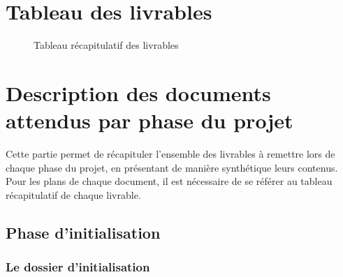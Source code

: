 \let\cleardoublepage\clearpage
\section{Tableau des livrables}

\vspace{-1cm}
\begin{figure}[H]
\noindent{}
\caption{Tableau récapitulatif des livrables}
\end{figure}

\section{Description des documents attendus par phase du projet}

Cette partie permet de récapituler l’ensemble des livrables à remettre lors de chaque phase du projet, en présentant de manière synthétique leurs contenus. \\

Pour les plans de chaque document, il est nécessaire de se référer au tableau récapitulatif de chaque livrable.

\subsection{Phase d’initialisation}

\subsubsection{Le dossier d’initialisation}

